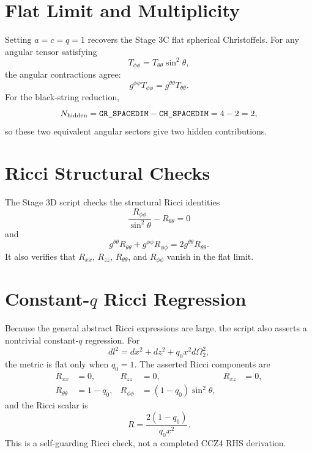 \documentclass[11pt]{article}
\newcommand{\GRSP}{\texttt{GR\_SPACEDIM}}
\newcommand{\CHSP}{\texttt{CH\_SPACEDIM}}
\begin{document}
\section{Flat Limit and Multiplicity}

Setting \(a=c=q=1\) recovers the Stage 3C flat spherical Christoffels. For any
angular tensor satisfying
\begin{equation}
  T_{\phi\phi}=T_{\theta\theta}\sin^2\theta,
\end{equation}
the angular contractions agree:
\begin{equation}
  g^{\phi\phi}T_{\phi\phi}
  =
  g^{\theta\theta}T_{\theta\theta}.
\end{equation}
For the black-string reduction,
\begin{equation}
  N_{\rm hidden}=\GRSP-\CHSP=4-2=2,
\end{equation}
so these two equivalent angular sectors give two hidden contributions.

\section{Ricci Structural Checks}

The Stage 3D script checks the structural Ricci identities
\begin{equation}
  \frac{R_{\phi\phi}}{\sin^2\theta} - R_{\theta\theta}=0
\end{equation}
and
\begin{equation}
  g^{\theta\theta}R_{\theta\theta}
  +
  g^{\phi\phi}R_{\phi\phi}
  =
  2g^{\theta\theta}R_{\theta\theta}.
\end{equation}
It also verifies that \(R_{xx}\), \(R_{zz}\), \(R_{\theta\theta}\), and
\(R_{\phi\phi}\) vanish in the flat limit.

\section{Constant-\texorpdfstring{\(q\)}{q} Ricci Regression}

Because the general abstract Ricci expressions are large, the script also
asserts a nontrivial constant-\(q\) regression. For
\begin{equation}
  dl^2 = dx^2 + dz^2 + q_0 x^2 d\Omega_2^2,
\end{equation}
the metric is flat only when \(q_0=1\). The asserted Ricci components are
\begin{align}
  R_{xx} &= 0,&
  R_{zz} &= 0,&
  R_{xz} &= 0,\\
  R_{\theta\theta} &= 1-q_0,&
  R_{\phi\phi} &= (1-q_0)\sin^2\theta,
\end{align}
and the Ricci scalar is
\begin{equation}
  R=\frac{2(1-q_0)}{q_0 x^2}.
\end{equation}
This is a self-guarding Ricci check, not a completed CCZ4 RHS derivation.
\end{document}
